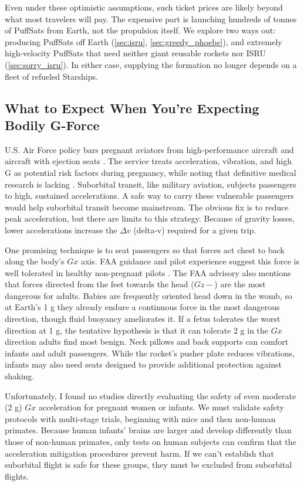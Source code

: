\documentclass{article}
\newcommand{\deltav}{\Delta v}
\begin{document}
Even under these optimistic assumptions, such ticket prices are likely beyond what most travelers will pay. The expensive part is launching hundreds of tonnes of PuffSats from Earth, not the propulsion itself. We explore two ways out: producing PuffSats off Earth (\autoref{sec:isru}, \autoref{sec:greedy_phoebe}), and extremely high-velocity PuffSats that need neither giant reusable rockets nor ISRU (\autoref{sec:sorry_isru}). In either case, supplying the formation no longer depends on a fleet of refueled Starships.


\subsection{What to Expect When You're Expecting Bodily G-Force}\label{sec:pregnant_women}\cite{expecting_pregnancy_book}
U.S. Air Force policy bars pregnant aviators from high-performance aircraft and aircraft with ejection seats \cite{usaf_pregnant_aircrew}. The service treats acceleration, vibration, and high G as potential risk factors during pregnancy, while noting that definitive medical research is lacking \cite{usaf_pregnant_aircrew}. Suborbital transit, like military aviation, subjects passengers to high, sustained accelerations.  A safe way to carry these vulnerable passengers would help suborbital transit become mainstream.  The obvious fix is to reduce peak acceleration, but there are limits to this strategy.  Because of gravity losses, lower accelerations increase the $\deltav$ (delta-v) required for a given trip.

One promising technique is to seat passengers so that forces act chest to back along the body's $Gx$ axis.   FAA guidance and pilot experience suggest this  force is well tolerated in healthy non-pregnant pilots \cite{lateral_acceleration}.  The FAA advisory also mentions that forces directed from the feet towards the head ($Gz-$) are the most dangerous for adults.   Babies are frequently oriented head down in the womb, so at Earth's 1 g they already endure a continuous force in the most dangerous direction, though fluid buoyancy ameliorates it. If a fetus tolerates the worst direction at 1 g, the tentative hypothesis is that it can tolerate 2 g in the $Gx$ direction adults find most benign.  Neck pillows and back supports can comfort infants and adult passengers.  While the rocket's pusher plate reduces vibrations, infants may also need seats designed to provide additional protection against shaking.

Unfortunately, I found no studies directly evaluating the safety of even moderate (2 g) $Gx$ acceleration for pregnant women or infants. We must validate safety protocols with multi-stage trials, beginning with mice and then non-human primates.  Because human infants' brains are larger and develop differently than those of non-human primates, only tests on human subjects can confirm that the acceleration mitigation procedures prevent harm.  If we can't establish that suborbital flight is safe for these groups, they must be excluded from suborbital flights.  
\end{document}
